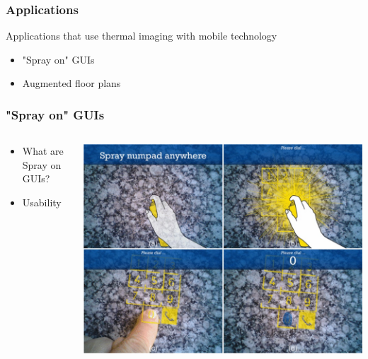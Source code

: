 \documentclass{beamer}
\begin{document}
\begin{frame}
	\frametitle{Applications}
	Applications that use thermal imaging with mobile technology 
	\begin{itemize}
		\item "Spray on" GUIs
		\item Augmented floor plans
	\end{itemize}
\end{frame}

\begin{frame}
	\frametitle{"Spray on" GUIs}
	
	\begin{columns}
	\begin{column}{0.45\textwidth}
	\begin{itemize}
		\item What are Spray on GUIs?  
		\item Usability
	\end{itemize}
		
	\end{column}
	\begin{column}{0.55\textwidth}
	\includegraphics[width=\textwidth]{../Sample_paper/images/numpad}
	\end{column}
	\end{columns}
\end{frame}

	
\end{document}

